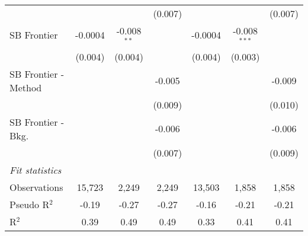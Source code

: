 \begin{tabular}{lcccccc}
                        &         &               & (0.007)     &              &                & (0.007)\\   
   SB Frontier          & -0.0004 & -0.008$^{**}$ &             & -0.0004      & -0.008$^{***}$ &   \\   
                        & (0.004) & (0.004)       &             & (0.004)      & (0.003)        &   \\   
   SB Frontier - Method &         &               & -0.005      &              &                & -0.009\\   
                        &         &               & (0.009)     &              &                & (0.010)\\   
   SB Frontier - Bkg.   &         &               & -0.006      &              &                & -0.006\\   
                        &         &               & (0.007)     &              &                & (0.009)\\   
   \midrule
   \emph{Fit statistics}\\
   Observations         & 15,723  & 2,249         & 2,249       & 13,503       & 1,858          & 1,858\\  
   Pseudo R$^2$         & -0.19   & -0.27         & -0.27       & -0.16        & -0.21          & -0.21\\  
   R$^2$                & 0.39    & 0.49          & 0.49        & 0.33         & 0.41           & 0.41\\  
   

\end{tabular}
